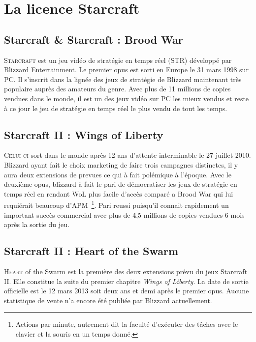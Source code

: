 \section{La licence Starcraft}%
\label{sec:la_licence_starcraft}

\subsection{Starcraft \& Starcraft : Brood War}%
\label{sub:starcraft_&_starcraft_brood_war}

\lettrine{S}{tarcraft} est un jeu vidéo de stratégie en temps réel (STR) développé
par Blizzard Entertainment. Le premier opus est sorti en Europe le 31
mars 1998 sur PC. Il s'inscrit dans la lignée des jeux de stratégie de
Blizzard maintenant très populaire auprès des amateurs du genre. Avec
plus de 11 millions de copies vendues dans le monde, il est un des
jeux vidéo sur PC les mieux vendus et reste à ce jour le jeu de
stratégie en temps réel le plus vendu de tout les temps.

\subsection{Starcraft II : Wings of Liberty}%
\label{sub:starcraft_ii_wings_of_liberty}

\lettrine{C}{elui-ci} sort dans le monde après 12 ans d'attente
interminable le 27 juillet 2010. Blizzard ayant fait le choix marketing
de faire trois campagnes distinctes, il y aura deux extensions de
prevues ce qui à fait polémique à l'époque. Avec le deuxième opus,
blizzard à fait le pari de démocratiser les jeux de stratégie en temps
réel en rendant WoL plus facile d'accès comparé a Brood War qui lui
requiérait beaucoup d'APM\, \footnote{Actions par minute, autrement dit
la faculté d'exécuter des tâches avec le clavier et la souris en un
temps donné.}. Pari reussi puisqu'il connait
rapidement un important succès commercial avec plus de 4,5 millions de
copies vendues 6 mois après la sortie du jeu.

\subsection{Starcraft II : Heart of the Swarm}%
\label{sub:starcraft_ii_heart_of_the_swarm}

\lettrine{H}{eart} of the Swarm est la première des deux extensions
prévu du jeux Starcraft II. Elle constitue la suite du premier chapitre
\emph{Wings of Liberty}. La date de sortie officielle est le 12 mars 2013 soit
deux ans et demi après le premier opus. Aucune statistique de vente n'a
encore été publiée par Blizzard actuellement.

